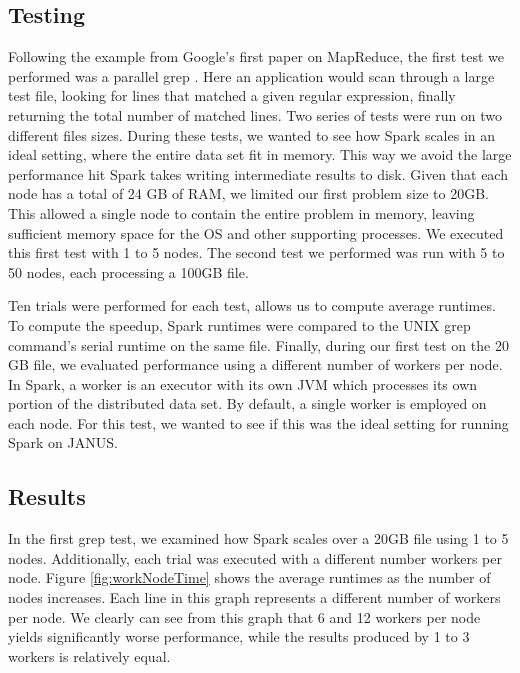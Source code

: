 \documentclass{article}
\begin{document}
\subsection{Testing}
Following the example from Google's first paper on MapReduce, the first test we
performed was a parallel grep \citep{dean-mapreduce}. Here an application would
scan through a large test file, looking for lines that matched a given regular
expression, finally returning the total number of matched lines. Two series of
tests were run on two different files sizes. During these tests, we wanted to
see how Spark scales in an ideal setting, where the entire data set fit in
memory. This way we avoid the large performance hit Spark takes writing
intermediate results to disk. Given that each node has a total of 24 GB of RAM,
we limited our first problem size to 20GB. This allowed a single node to
contain the entire problem in memory, leaving sufficient memory space for the
OS and other supporting processes. We executed this first test with 1 to 5
nodes. The second test we performed was run with 5 to 50 nodes, each processing
a 100GB file.

Ten trials were performed for each test, allows us to compute average
runtimes. To compute the speedup, Spark runtimes were compared to the UNIX grep
command's serial runtime on the same file. Finally, during our first test on the
20 GB file, we evaluated performance using a different number of workers per
node. In Spark, a worker is an executor with its own JVM which processes its
own portion of the distributed data set. By default, a single worker is
employed on each node. For this test, we wanted to see if this was the ideal
setting for running Spark on JANUS.


\subsection{Results}
In the first grep test, we examined how Spark scales over a 20GB file using 1
to 5 nodes. Additionally, each trial was executed with a different number
workers per node. Figure \ref{fig:workNodeTime} shows the average runtimes as
the number of nodes increases. Each line in this graph represents a different
number of workers per node. We clearly can see from this graph that 6 and 12
workers per node yields significantly worse performance, while the results
produced by 1 to 3 workers is relatively equal.
\end{document}
